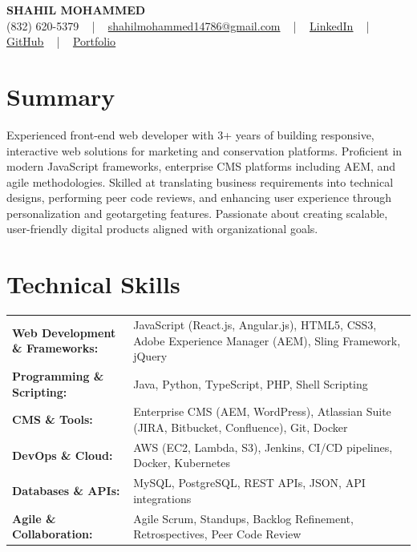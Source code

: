 \documentclass[letterpaper,11pt]{article}
\begin{document}
\begin{center}
    {\fontsize{14pt}{12pt}\selectfont \textbf{\MakeUppercase{Shahil Mohammed}}}\\ \vspace{2pt}
    \fontsize{10pt}{12pt}\selectfont (832) 620-5379 ~ | ~ \href{mailto:shahilmohammed14786@gmail.com}{shahilmohammed14786@gmail.com} ~ | ~  
    \href{https://www.linkedin.com/in/shahil-mohammed-9652931a1/}{\color{blue}\underline{LinkedIn}}  ~ | ~ 
    \href{https://github.com/freakbeast14}{\color{blue}\underline{GitHub}} ~ | ~ 
    \href{https://shahil-mohammed.netlify.app/}{\color{blue}\underline{Portfolio}}
    \vspace{-8pt}
\end{center}

\section{Summary}
\fontsize{9pt}{10pt}\selectfont
Experienced front-end web developer with 3+ years of building responsive, interactive web solutions for marketing and conservation platforms. Proficient in modern JavaScript frameworks, enterprise CMS platforms including AEM, and agile methodologies. Skilled at translating business requirements into technical designs, performing peer code reviews, and enhancing user experience through personalization and geotargeting features. Passionate about creating scalable, user-friendly digital products aligned with organizational goals.
 \vspace{-5pt}
 
\section{Technical Skills}
        \vspace{-14pt}
        \begin{table}[h]
            \fontsize{9pt}{10pt}\selectfont
            \begin{tabular}{p{0.3\linewidth} p{0.7\linewidth}}
                \textbf{Web Development \& Frameworks:} & JavaScript (React.js, Angular.js), HTML5, CSS3, Adobe Experience Manager (AEM), Sling Framework, jQuery \\
                \textbf{Programming \& Scripting:} & Java, Python, TypeScript, PHP, Shell Scripting \\
                \textbf{CMS \& Tools:} & Enterprise CMS (AEM, WordPress), Atlassian Suite (JIRA, Bitbucket, Confluence), Git, Docker \\
                \textbf{DevOps \& Cloud:} & AWS (EC2, Lambda, S3), Jenkins, CI/CD pipelines, Docker, Kubernetes \\
                \textbf{Databases \& APIs:} & MySQL, PostgreSQL, REST APIs, JSON, API integrations \\
                \textbf{Agile \& Collaboration:} & Agile Scrum, Standups, Backlog Refinement, Retrospectives, Peer Code Review \\
            \end{tabular}
        \end{table}
 \vspace{-15pt}
 
\end{document}
